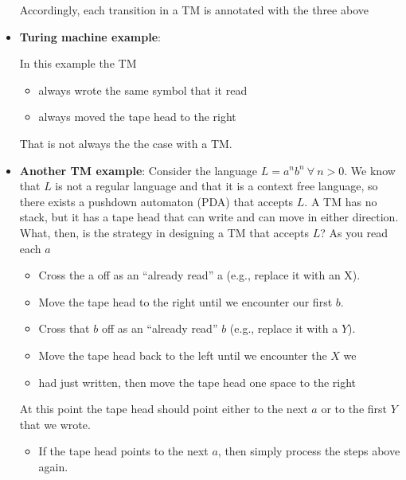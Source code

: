 \documentclass{report}
\begin{document}
\begin{itemize}
\begin{enumerate}
            \end{enumerate}
            \bigbreak \noindent 
            Accordingly, each transition in a TM is annotated with the three above
        \item \textbf{Turing machine example}:
            \bigbreak \noindent 
            \begin{figure}[ht]
                \centering
                \label{fig:t1}
            \end{figure}
            \bigbreak \noindent 
            In this example the TM
            \begin{itemize}
                \item always wrote the same symbol that it read
                \item always moved the tape head to the right
            \end{itemize}
            That is not always the the case with a TM.
        \item \textbf{Another TM example}: Consider the language $L = a^{n}b^{n} \ \forall \ n> 0$. We know that $L$ is not a regular language and that it is a context free language, so there exists a pushdown automaton (PDA) that accepts $L$.
            \bigbreak \noindent 
            A TM has no stack, but it has a tape head that can write and can move in either direction. What, then, is the strategy in designing a TM that accepts $L$?
            \bigbreak \noindent 
            As you read each $a$
            \begin{itemize}
                \item Cross the a off as an “already read” a (e.g., replace it with an X).
                \item Move the tape head to the right until we encounter our first $b $.
                \item Cross that $b$ off as an “already read” $b$ (e.g., replace it with a $Y$).
                \item Move the tape head back to the left until we encounter the $X$ we
                \item had just written, then move the tape head one space to the right
            \end{itemize}
            At this point the tape head should point either to the next $a$ or to the first $Y$ that we wrote.
            \begin{itemize}
                \item If the tape head points to the next $a$, then simply process the steps above again.

\end{itemize}
\end{itemize}
\end{document}
